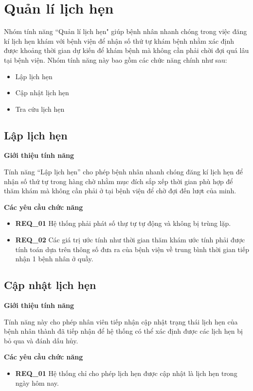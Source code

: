 \section{Quản lí lịch hẹn}

Nhóm tính năng ``Quản lí lịch hẹn" giúp bệnh nhân nhanh chóng trong việc đăng kí lịch hẹn khám với bệnh viện để nhận số thứ tự khám bệnh nhằm xác định được khoảng thời gian dự kiến để khám bệnh mà không cần phải chời đợi quá lâu tại bệnh viện. Nhóm tính năng này bao gồm các chức năng chính như sau:
\begin{itemize}
  \item Lập lịch hẹn
  \item Cập nhật lịch hẹn
  \item Tra cứu lịch hẹn
\end{itemize}

\subsection{Lập lịch hẹn}

\noindent \textbf{Giới thiệu tính năng}

Tính năng ``Lập lịch hẹn'' cho phép bệnh nhân nhanh chóng đăng kí lịch hẹn để nhận số thứ tự trong hàng chờ nhằm mục đích sắp xếp thời gian phù hợp để thăm khám mà không cần phải ở tại bệnh viện để chờ đợi đến lượt của minh.

\noindent \textbf{Các yêu cầu chức năng}
\begin{itemize}
  \item \textbf{REQ\_01} Hệ thống phải phát số thự tự tự động và không bị trùng lặp.
  \item \textbf{REQ\_02} Các giá trị ước tính như thời gian thăm khám ước tính phải được tính toán dựa trên thông số đưa ra của bệnh viện về trung bình thời gian tiếp nhận 1 bệnh nhân ở quầy.
\end{itemize}

\subsection{Cập nhật lịch hẹn}

\noindent \textbf{Giới thiệu tính năng}

Tính năng này cho phép nhân viên tiếp nhận cập nhật trạng thái lịch hẹn của bệnh nhân thành đã tiếp nhận để hệ thống có thể xác định được các lịch hẹn bị bỏ qua và đánh dấu hủy.

\noindent \textbf{Các yêu cầu chức năng}
\begin{itemize}
  \item \textbf{REQ\_01} Hệ thống chỉ cho phép lịch hẹn được cập nhật là lịch hẹn trong ngày hôm nay.
\end{itemize}

